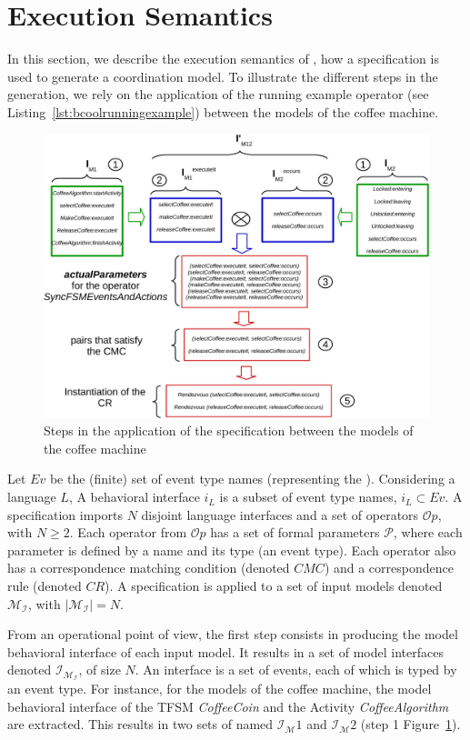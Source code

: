 \section{Execution Semantics}
In this section, we describe the execution semantics of \bcool, \ie how a \bcool specification is used to generate a coordination model. To illustrate the different steps in the generation, we rely on the application of the running example operator (see Listing~\ref{lst:bcoolrunningexample}) between the models of the coffee machine.

\begin{figure} [h]
	\center
	\includegraphics[width=.9\textwidth]{bcool/figs/semantics}
	\caption{Steps in the application of the \bcool specification between the models of the coffee machine}
	\label{fig:semantics}
\end{figure}

Let $Ev$ be the (finite) set of event type names (representing the \dse). Considering a language $L$, A behavioral interface $i_L$ is a subset of event type names, $i_L \subset Ev$. A \bcool specification imports $N$ disjoint language interfaces and a set of operators $\mathcal{O}p$, with $N\geq 2$. Each operator from $\mathcal{O}p$ has a set of formal parameters $\mathcal{P}$, where each parameter is defined by a name and its type (\ie an event type). Each operator also has a correspondence matching condition (denoted $CMC$) and a correspondence rule (denoted $CR$). A \bcool specification is applied to a set of input models denoted $\mathcal{M_I}$, with $|\mathcal{M_I}| = N$.

From an operational point of view, the first step consists in producing the model behavioral interface of each input model. It results in a set of model interfaces denoted $\mathcal{I_{M_I}}$, of size $N$. An interface is a set of events, each of which is typed by an event type. For instance, for the models of the coffee machine, the model behavioral interface of the TFSM \emph{CoffeeCoin} and the Activity \emph{CoffeeAlgorithm} are extracted. This results in two sets of \mse named  $\mathcal{I_M}{1}$ and $\mathcal{I_M}{2}$ (step 1 Figure~\ref{fig:semantics}).

